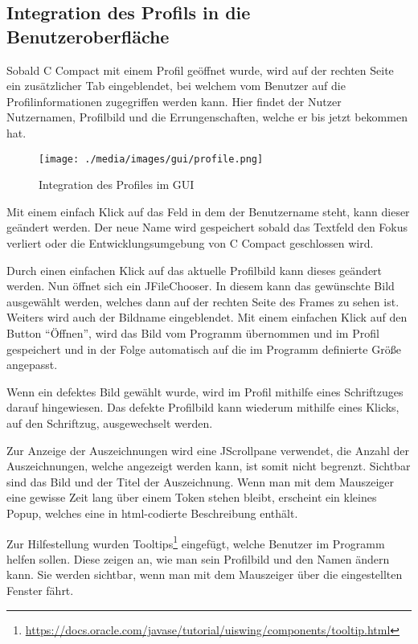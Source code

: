 \iffabian
\else
	\subsection{Integration des Profils in die Benutzeroberfläche}
\fi

Sobald C Compact mit einem Profil geöffnet wurde, wird auf der rechten Seite ein zusätzlicher Tab eingeblendet, bei welchem vom Benutzer auf die Profilinformationen zugegriffen werden kann. Hier findet der Nutzer Nutzernamen, Profilbild und die Errungenschaften, welche er bis jetzt bekommen hat.

\begin{figure}[h] 
  \centering
     \texttt{[image: ./media/images/gui/profile.png]}
  \caption{Integration des Profiles im GUI}
  \label{fig:profile_gui}
\end{figure}


Mit einem einfach Klick auf das Feld in dem der Benutzername steht, kann dieser geändert werden. Der neue Name wird gespeichert sobald das Textfeld den Fokus verliert oder die Entwicklungsumgebung von C Compact geschlossen wird.

Durch einen einfachen Klick auf das aktuelle Profilbild kann dieses geändert werden. Nun öffnet sich ein JFileChooser. In diesem kann das gewünschte Bild ausgewählt werden, welches dann auf der rechten Seite des Frames zu sehen ist. Weiters wird auch der Bildname eingeblendet. Mit einem einfachen Klick auf den Button "`Öffnen"', wird das Bild vom Programm übernommen und im Profil gespeichert und in der Folge automatisch auf die im Programm definierte Größe angepasst.

Wenn ein defektes Bild gewählt wurde, wird im Profil mithilfe eines Schriftzuges darauf hingewiesen. Das defekte Profilbild kann wiederum mithilfe eines Klicks, auf den Schriftzug, ausgewechselt werden.

Zur Anzeige der Auszeichnungen wird eine JScrollpane verwendet, die Anzahl der Auszeichnungen, welche angezeigt werden kann, ist somit nicht begrenzt. Sichtbar sind das Bild und der Titel der Auszeichnung. Wenn man mit dem Mauszeiger eine gewisse Zeit lang über einem Token stehen bleibt, erscheint ein kleines Popup, welches eine in html-codierte Beschreibung enthält.

Zur Hilfestellung wurden Tooltips\footnote{\url{https://docs.oracle.com/javase/tutorial/uiswing/components/tooltip.html}} eingefügt, welche Benutzer im Programm helfen sollen. Diese zeigen an, wie man sein Profilbild und den Namen ändern kann. Sie werden sichtbar, wenn man mit dem Mauszeiger über die eingestellten Fenster fährt.